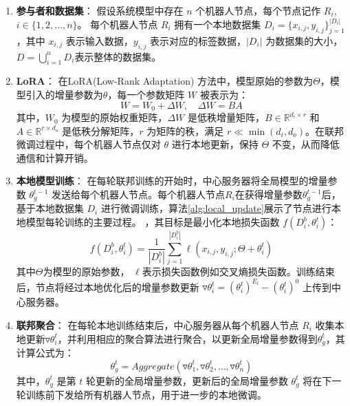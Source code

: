 \documentclass[lettersize,journal]{IEEEtran}
\begin{document}
\begin{enumerate}
    \item \textbf{参与者和数据集}：
    假设系统模型中存在 $n$ 个机器人节点，每个节点记作 $R_i$, $i \in \{1, 2, \ldots, n\}$。 每个机器人节点 $R_i$ 拥有一个本地数据集 $D_i = \{x_{i,j}, y_{i,j}\}_{j=1}^{|D_i|}$，其中 $x_{i,j}$ 表示输入数据，$y_{i,j}$ 表示对应的标签数据，$|D_i|$ 为数据集的大小，$D = \bigcup_{i=1}^{n} D_i$表示整体的数据集。

    \item \textbf{LoRA}：
    在LoRA(Low-Rank Adaptation) 方法中，模型原始的参数为$\Theta$，模型引入的增量参数为$\theta$，每一个参数矩阵 $W$ 被表示为：
    \[
    W = W_0 + \Delta W, \quad \Delta W = BA
    \]
    其中，$W_0$ 为模型的原始权重矩阵，$\Delta W$ 是低秩增量矩阵，$B \in \mathbb{R}^{d_i \times r}$ 和 $A \in \mathbb{R}^{r \times d_o}$ 是低秩分解矩阵，$r$ 为矩阵的秩，满足 $r \ll \min(d_i, d_o)$。在联邦微调过程中，每个机器人节点仅对 $\theta$ 进行本地更新，保持 $\Theta$ 不变，从而降低通信和计算开销。
    
    \item \textbf{本地模型训练}：
    在每轮联邦训练的开始时，中心服务器将全局模型的增量参数 $\theta_g^{t-1}$ 发送给每个机器人节点。每个机器人节点$R_i$在获得增量参数$\theta_g^{t-1}$后，基于本地数据集 $D_i$ 进行微调训练，算法\ref{alg:local_update}展示了节点进行本地模型每轮训练的主要过程。
    ，其目标是最小化本地损失函数 $f(D_i^b, \theta_i^{t})$：
    \[
    f(D_i^b, \theta_i^{t}) = \frac{1}{|D_i^b|} \sum_{j=1}^{|D_i^b|} \ell(x_{i,j}, y_{i,j}; \Theta + \theta_i^{t})
    \]
    其中$\Theta$为模型的原始参数， $\ell$表示损失函数例如交叉熵损失函数。训练结束后，节点将经过本地优化后的增量参数更新 $\triangledown \theta_i^t = (\theta_i^t)^{E_l} - (\theta_i^t)^0$ 上传到中心服务器。
    \item \textbf{联邦聚合}：
    在每轮本地训练结束后，中心服务器从每个机器人节点 $R_i$ 收集本地更新$\triangledown \theta_i^t$，并利用相应的聚合算法进行聚合，以更新全局增量参数得到$\theta_g^t$，其计算公式为：
    \[
    \theta_g^t = Aggregate(\triangledown \theta_1^t, \triangledown \theta_2^t, \dots, \triangledown \theta_n^t)
    \]
    其中，$\theta_g^t$ 是第 $t$ 轮更新的全局增量参数，更新后的全局增量参数 $\theta_g^t$ 将在下一轮训练前下发给所有机器人节点，用于进一步的本地微调。
\end{enumerate}
\end{document}
